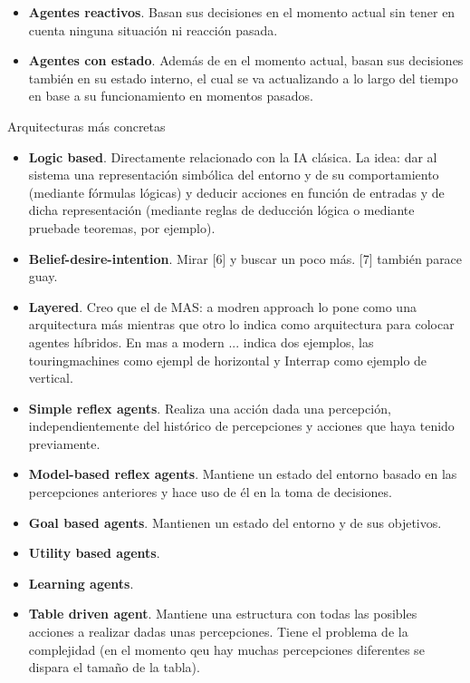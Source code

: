 \begin{itemize}
	\item \textbf{Agentes reactivos}. Basan sus decisiones en el momento actual sin tener en cuenta ninguna situación ni reacción pasada.
	\item \textbf{Agentes con estado}. Además de en el momento actual, basan sus decisiones también en su estado interno, el cual se va actualizando a lo largo del tiempo en base a su funcionamiento en momentos pasados.
\end{itemize}

Arquitecturas más concretas

\begin{itemize}
	\item \textbf{Logic based}. Directamente relacionado con la IA clásica. La idea: dar al sistema una representación simbólica del entorno y de su comportamiento (mediante fórmulas lógicas) y deducir acciones en función de entradas y de dicha representación (mediante reglas de deducción lógica o mediante pruebade teoremas, por ejemplo).
	\item \textbf{Belief-desire-intention}. Mirar [6] y buscar un poco más. [7] también parace guay.
	\item \textbf{Layered}. Creo que el de MAS: a modren approach lo pone como una arquitectura más mientras que otro lo indica como arquitectura para colocar agentes híbridos. En mas a modern ... indica dos ejemplos, las touringmachines como ejempl de horizontal y Interrap como ejemplo de vertical.
	\item \textbf{Simple reflex agents}. Realiza una acción dada una percepción, independientemente del histórico de percepciones y acciones que haya tenido previamente.
	\item \textbf{Model-based reflex agents}. Mantiene un estado del entorno basado en las percepciones anteriores y hace uso de él en la toma de decisiones.
	\item \textbf{Goal based agents}. Mantienen un estado del entorno y de sus objetivos.
	\item \textbf{Utility based agents}.
	\item \textbf{Learning agents}.
	\item \textbf{Table driven agent}. Mantiene una estructura con todas las posibles acciones a realizar dadas unas percepciones. Tiene el problema de la complejidad (en el momento qeu hay muchas percepciones diferentes se dispara el tamaño de la tabla).
\end{itemize}


